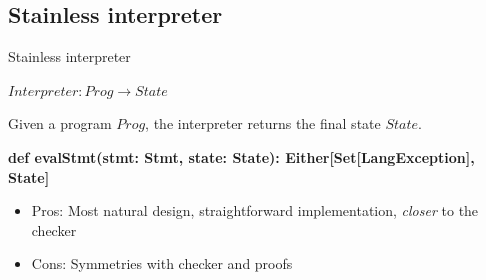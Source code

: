 \documentclass{EESD}
\begin{document}
\subsection{Stainless interpreter}
\begin{frame}[fragile]{Stainless interpreter}




    \(Interpreter: Prog \to State\)

    Given a program \(Prog\), the interpreter returns the final state \(State\).

    \vspace{1cm}

    {\textbf{def evalStmt(stmt: Stmt, state: State): Either[Set[LangException], State]}}

    \vspace{1cm}

    \begin{itemize}
        \item Pros: Most natural design, straightforward implementation, \textit{closer} to the checker
        \item Cons: Symmetries with checker and proofs
    \end{itemize}

\end{frame}
\end{document}
